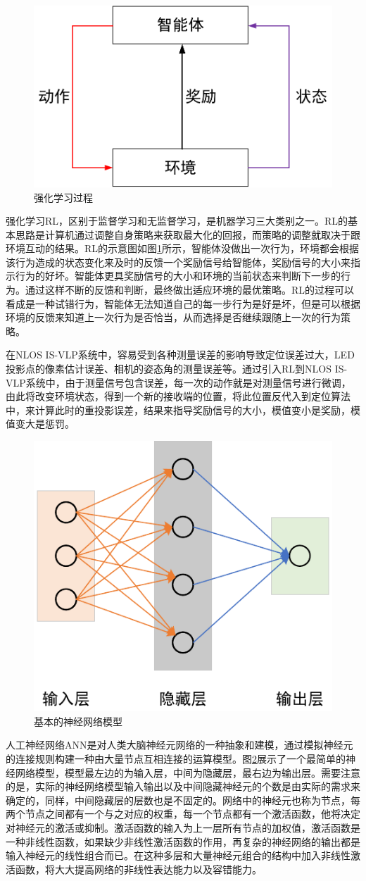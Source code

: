 \begin{figure}[!b]
  \centering
  \includegraphics[width=0.5\linewidth]{FIG/RL.pdf}
  \caption{强化学习过程}
  \label{fig:RL}
\end{figure}
强化学习RL，区别于监督学习和无监督学习，是机器学习三大类别之一。RL的基本思路是计算机通过调整自身策略来获取最大化的回报，而策略的调整就取决于跟环境互动的结果。RL的示意图如图\ref{fig:RL}所示，智能体没做出一次行为，环境都会根据该行为造成的状态变化来及时的反馈一个奖励信号给智能体，奖励信号的大小来指示行为的好坏。智能体更具奖励信号的大小和环境的当前状态来判断下一步的行为。通过这样不断的反馈和判断，最终做出适应环境的最优策略。RL的过程可以看成是一种试错行为，智能体无法知道自己的每一步行为是好是坏，但是可以根据环境的反馈来知道上一次行为是否恰当，从而选择是否继续跟随上一次的行为策略。


在NLOS IS-VLP系统中，容易受到各种测量误差的影响导致定位误差过大，LED投影点的像素估计误差、相机的姿态角的测量误差等。通过引入RL到NLOS IS-VLP系统中，由于测量信号包含误差，每一次的动作就是对测量信号进行微调，由此将改变环境状态，得到一个新的接收端的位置，将此位置反代入到定位算法中，来计算此时的重投影误差，结果来指导奖励信号的大小，模值变小是奖励，模值变大是惩罚。


\begin{figure}[!b]
  \centering
  \includegraphics[width=0.5\linewidth]{FIG/ANN.pdf}
  \caption{基本的神经网络模型}
  \label{fig:ANN}
\end{figure}
人工神经网络ANN是对人类大脑神经元网络的一种抽象和建模，通过模拟神经元的连接规则构建一种由大量节点互相连接的运算模型。图\ref{fig:ANN}展示了一个最简单的神经网络模型，模型最左边的为输入层，中间为隐藏层，最右边为输出层。需要注意的是，实际的神经网络模型输入输出以及中间隐藏神经元的个数是由实际的需求来确定的，同样，中间隐藏层的层数也是不固定的。网络中的神经元也称为节点，每两个节点之间都有一个与之对应的权重，每一个节点都有一个激活函数，他将决定对神经元的激活或抑制。激活函数的输入为上一层所有节点的加权值，激活函数是一种非线性函数，如果缺少非线性激活函数的作用，再复杂的神经网络的输出都是输入神经元的线性组合而已。在这种多层和大量神经元组合的结构中加入非线性激活函数，将大大提高网络的非线性表达能力以及容错能力。

